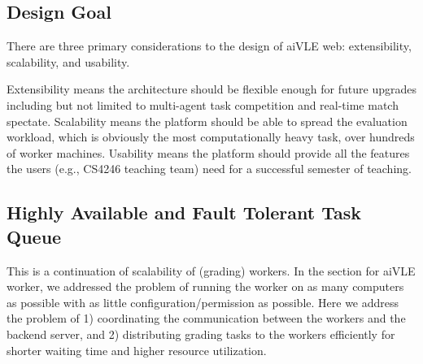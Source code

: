 \subsection{Design Goal}
There are three primary considerations to the design of aiVLE web: extensibility, scalability, and usability. 

Extensibility means the architecture should be flexible enough for future upgrades including but not limited to multi-agent task competition and real-time match spectate. Scalability means the platform should be able to spread the evaluation workload, which is obviously the most computationally heavy task, over hundreds of worker machines. Usability means the platform should provide all the features the users (e.g., CS4246 teaching team) need for a successful semester of teaching.

\subsection{Highly Available and Fault Tolerant Task Queue}
\label{ch:aivle-web_highly-available-task-queue}
This is a continuation of scalability of (grading) workers. In the section for aiVLE worker, we addressed the problem of running the worker on as many computers as possible with as little configuration/permission as possible. Here we address the problem of 1) coordinating the communication between the workers and the backend server, and 2) distributing grading tasks to the workers efficiently for shorter waiting time and higher resource utilization.
